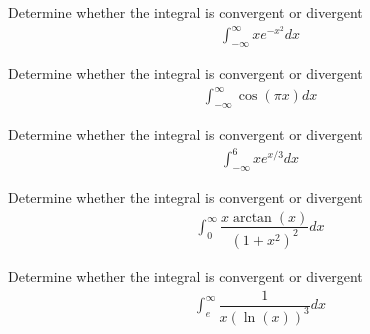\begin{example}
Determine whether the integral is convergent or divergent
\begin{align*}
    \int_{-\infty}^{\infty} xe^{-x^{2}} dx
\end{align*}
\end{example}

\begin{example}
Determine whether the integral is convergent or divergent
\begin{align*}
    \int_{-\infty}^{\infty} \cos(\pi x) dx
\end{align*}
\end{example}

\begin{example}
Determine whether the integral is convergent or divergent
\begin{align*}
    \int_{-\infty}^{6} xe^{x/3} dx
\end{align*}
\end{example}

\begin{example}
Determine whether the integral is convergent or divergent
\begin{align*}
    \int_{0}^{\infty} \dfrac{x \arctan(x)}{(1+x^{2})^{2}}dx
\end{align*}
\end{example}

\begin{example}
Determine whether the integral is convergent or divergent
\begin{align*}
    \int_{e}^{\infty} \dfrac{1}{x (\ln(x))^{3}}dx
\end{align*}
\end{example}